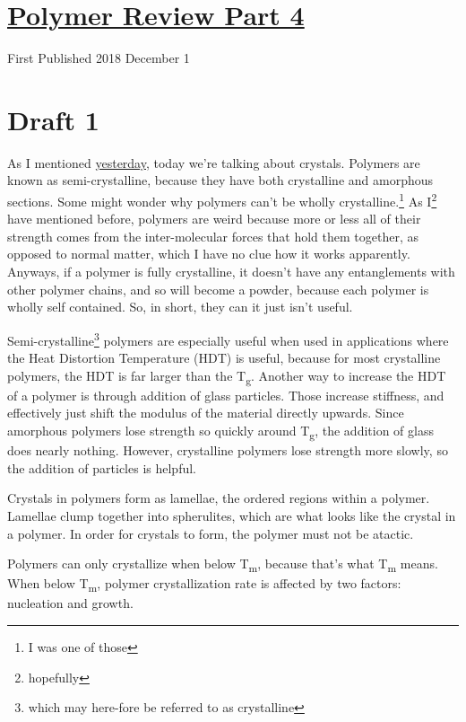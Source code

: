 \documentclass[12pt]{article}[titlepage]
\newcommand{\1}{\={a}}
\newcommand{\2}{\={e}}
\newcommand{\3}{\={\i}}
\newcommand{\4}{\=o}
\newcommand{\5}{\=u}
\newcommand{\6}{\={A}}
\newcommand{\sub}[1]{\textsubscript{#1}}
\renewcommand{\,}{\textsuperscript{,}}
\begin{document}
\doublespacing
\section{\href{polymer-4.html}{Polymer Review Part 4}}
First Published 2018 December 1

\section{Draft 1}
As I mentioned \href{polymer-3.html}{yesterday}, today we're talking about crystals.
Polymers are known as semi-crystalline, because they have both crystalline and amorphous sections.
Some might wonder why polymers can't be wholly crystalline.\footnote{I was one of those}
As I\footnote{hopefully} have mentioned before, polymers are weird because more or less all of their strength comes from the inter-molecular forces that hold them together, as opposed to normal matter, which I have no clue how it works apparently.
Anyways, if a polymer is fully crystalline, it doesn't have any entanglements with other polymer chains, and so will become a powder, because each polymer is wholly self contained.
So, in short, they can it just isn't useful.

Semi-crystalline\footnote{which may here-fore be referred to as crystalline} polymers are especially useful when used in applications where the Heat Distortion Temperature (HDT) is useful, because for most crystalline polymers, the HDT is far larger than the T\sub{g}.
Another way to increase the HDT of a polymer is through addition of glass particles.
Those increase stiffness, and effectively just shift the modulus of the material directly upwards.
Since amorphous polymers lose strength so quickly around T\sub{g}, the addition of glass does nearly nothing.
However, crystalline polymers lose strength more slowly, so the addition of particles is helpful.

Crystals in polymers form as lamellae, the ordered regions within a polymer.
Lamellae clump together into spherulites, which are what looks like the crystal in a polymer.
In order for crystals to form, the polymer must not be atactic.

Polymers can only crystallize when below T\sub{m}, because that's what T\sub{m} means.
When below T\sub{m}, polymer crystallization rate is affected by two factors: nucleation and growth.
\end{document}
